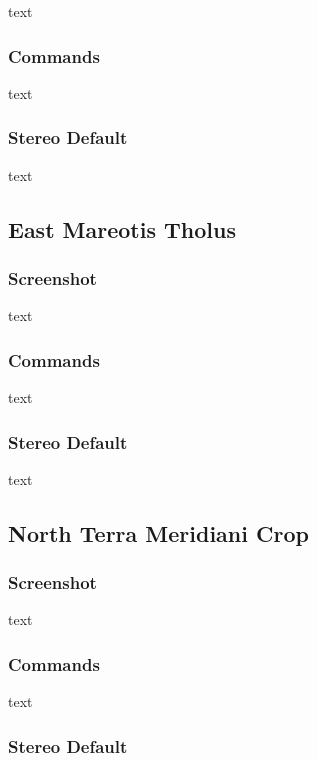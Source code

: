 text

\subsubsection*{Commands}

text

\subsubsection*{Stereo Default}

text

\subsection{East Mareotis Tholus}

\subsubsection*{Screenshot}

text

\subsubsection*{Commands}

text

\subsubsection*{Stereo Default}

text

\subsection{North Terra Meridiani Crop}

\subsubsection*{Screenshot}

text

\subsubsection*{Commands}

text

\subsubsection*{Stereo Default}

